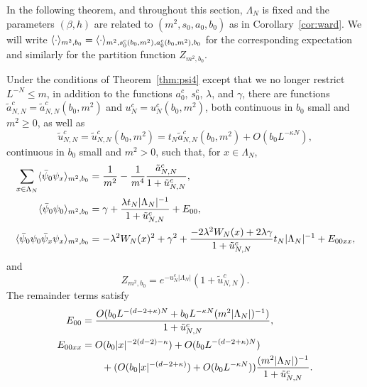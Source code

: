\documentclass[11pt]{amsart}
\numberwithin{equation}{section}
\numberwithin{theorem}{section}
\newcommand{\1}{{\bf 1}}
\newcommand{\clambda}{\lambda}
\newcommand{\cgamma}{\gamma}
\begin{document}
In the following theorem, and throughout this section, $\Lambda_{N}$ is fixed and the parameters
$(\beta,h)$ are related to $(m^2,s_0,a_0,b_0)$ as in
Corollary~\ref{cor:ward}.  We will write
$\langle \cdot \rangle_{m^2,b_0} =
\langle \cdot \rangle_{m^2,s_0^c(b_0,m^2),a_0^c(b_0,m^2),b_0}$ for the
corresponding expectation and similarly for the partition function
$Z_{m^2,b_0}$.

\begin{theorem} \label{thm:psi4-full}
  Under the conditions of Theorem~\ref{thm:psi4} except that we no longer restrict $L^{-N}\leq m$, in addition to the functions
  $a^{c}_{0}$, $s^{c}_{0}$, $\lambda$, and $\gamma$, there are functions 
  $\tilde a_{N,N}^c = \tilde a_{N,N}^c(b_0,m^2)$ and $u_N^c = u_N^c(b_0,m^2)$,
  both continuous in $b_0$ small and $m^2\geq 0$, as well as
  \begin{equation}
    \label{e:tildeu}
    \tilde u_{N,N}^c = \tilde u_{N,N}^c(b_0,m^2)= t_N\tilde a_{N,N}^c(b_0,m^2)  + O(b_0L^{-\kappa N}),
  \end{equation}
  continuous in $b_0$ small and $m^2> 0$, such that, for $x\in\Lambda_N$,
  \begin{align} \label{e:suscept-atilde-thm}
    \sum_{x\in\Lambda_N} \avg{\bar\psi_0\psi_x}_{m^2, b_0}
    &= \frac{1}{m^2}
    - \frac{1}{m^4} 
    \frac{\tilde a_{N,N}^c}{1+\tilde u_{N,N}^c}, \\
    \label{e:1pt-b-thm}
    \avg{\bar\psi_0\psi_0}_{m^2,b_0}
    &=
    \cgamma + \frac{\clambda t_N |\Lambda_N|^{-1}}{1+\tilde u_{N,N}^c}  +E_{00}
      ,
      \\
  \label{e:2pt-b-thm}
    \avg{\bar\psi_0\psi_0\bar\psi_x\psi_x}_{m^2,b_0}
    &=
      -\clambda^2 
      W_N(x)^2
      +\gamma^2
      +
      \frac{
        -2\lambda^2 
        W_N(x)
      + 2\clambda\gamma 
      }{1+\tilde u_{N,N}^c} t_N|\Lambda_N|^{-1}
    +E_{00xx}
      ,
\end{align}
and 
\begin{equation}
    \label{e:ZuNNaNN}
    Z_{m^{2},b_{0}} = e^{-u_{N}^{c}|\Lambda_N|}(1+\tilde u_{N,N}^{c}). 
\end{equation}
The remainder terms satisfy
\begin{align}
  E_{00}
  &=
    \frac{O(b_0L^{-(d-2+\kappa)N}+b_0L^{-\kappa N}(m^2|\Lambda_N|)^{-1})}{1+\tilde u_{N,N}^c},
  \\
  E_{00xx}
   &= O(b_0|x|^{-2(d-2)-\kappa}) + O(b_0L^{-(d-2+\kappa)N}) 
    \nonumber\\
  &\qquad
    +
    (O(b_0|x|^{-(d-2+\kappa)})+ O(b_0L^{-\kappa N})) \frac{(m^2|\Lambda_N|)^{-1}}{1+\tilde u_{N,N}^c}.
\end{align}
\end{theorem}
\end{document}
